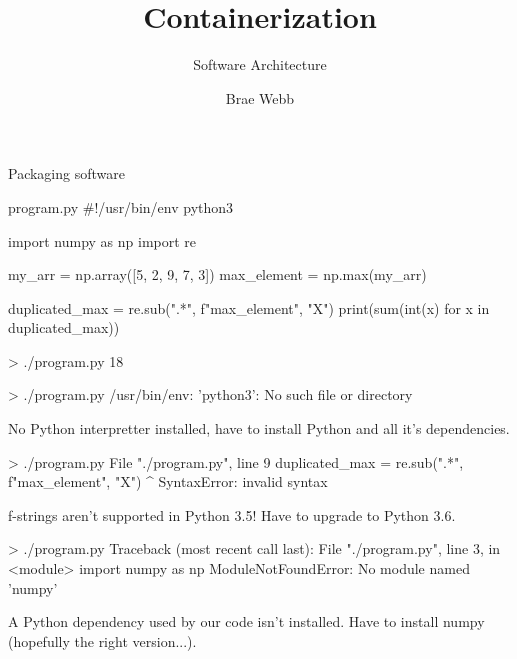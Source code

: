 \documentclass{slide}
\title{Containerization}
\subtitle{Software Architecture}
\author{Brae Webb}
\date{\week{3}}
\begin{document}
\maketitle



\begin{frame}[fragile]{Packaging software}
    \vspace{-1em}
    \begin{code}[language=python]{program.py}
#!/usr/bin/env python3

import numpy as np
import re

my_arr = np.array([5, 2, 9, 7, 3])
max_element = np.max(my_arr)

duplicated_max = re.sub(".*", f"{max_element}", "X")
print(sum(int(x) for x in duplicated_max))
    \end{code}
    \begin{code}[numbers=none]{}
> ./program.py
18
    \end{code}
\end{frame}


\begin{frame}[fragile]
    \begin{code}[numbers=none]{}
> ./program.py
/usr/bin/env: 'python3': No such file or directory
    \end{code}
    \pause
    No Python interpretter installed,
    have to install Python and all it's dependencies.
\end{frame}

\begin{frame}[fragile]
    \begin{code}[numbers=none]{}
> ./program.py
File "./program.py", line 9
    duplicated_max = re.sub(".*", f"{max_element}", "X")
                                                 ^
SyntaxError: invalid syntax
    \end{code}
    \pause
    f-strings aren't supported in Python 3.5!
    Have to upgrade to Python 3.6.
\end{frame}

\begin{frame}[fragile]
    \begin{code}[numbers=none]{}
> ./program.py
Traceback (most recent call last):
  File "./program.py", line 3, in <module>
    import numpy as np
ModuleNotFoundError: No module named 'numpy'
    \end{code}
    \pause
    A Python dependency used by our code isn't installed.
    Have to install numpy (hopefully the right version...).
\end{frame}
\end{document}
